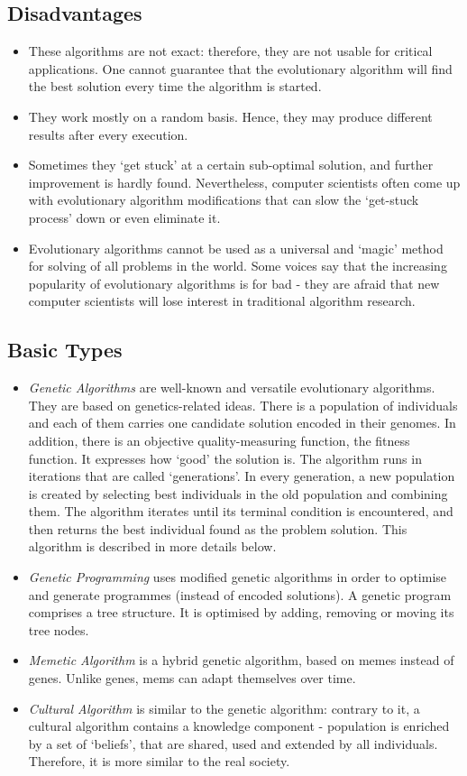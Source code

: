 \subsection{Disadvantages}

\begin{itemize}
\item{These algorithms are not exact: therefore, they are not usable for critical applications. One cannot guarantee that the evolutionary algorithm will find the best solution every time the algorithm is started.}
\item{They work mostly on a random basis. Hence, they may produce different results after every execution.}
\item{Sometimes they `get stuck' at a certain sub-optimal solution, and further improvement is hardly found. Nevertheless, computer scientists often come up with evolutionary algorithm modifications that can slow the `get-stuck process' down or even eliminate it.}
\item{Evolutionary algorithms cannot be used as a universal and `magic' method for solving of all problems in the world. Some voices say that the increasing popularity of evolutionary algorithms is for bad - they are afraid that new computer scientists will lose interest in traditional algorithm research.}
\end{itemize}

\subsection{Basic Types}

\begin{itemize}
\item{{\em Genetic Algorithms} are well-known and versatile evolutionary algorithms. They are based on genetics-related ideas. There is a population of individuals and each of them carries one candidate solution encoded in their genomes. In addition, there is an objective quality-measuring function, the fitness function. It expresses how `good' the solution is. The algorithm runs in iterations that are called `generations'. In every generation, a new population is created by selecting best individuals in the old population and combining them. The algorithm iterates until its terminal condition is encountered, and then returns the best individual found as the problem solution. This algorithm is described in more details below.}
\item{{\em Genetic Programming} uses modified genetic algorithms in order to optimise and generate programmes (instead of encoded solutions). A genetic program comprises a tree structure. It is optimised by adding, removing or moving its tree nodes.}
\item{{\em Memetic Algorithm} is a hybrid genetic algorithm, based on memes instead of genes. Unlike genes, mems can adapt themselves over time.}
\item{{\em Cultural Algorithm} is similar to the genetic algorithm: contrary to it, a cultural algorithm contains a knowledge component - population is enriched by a set of `beliefs', that are shared, used and extended by all individuals. Therefore, it is more similar to the real society.}
\end{itemize}

